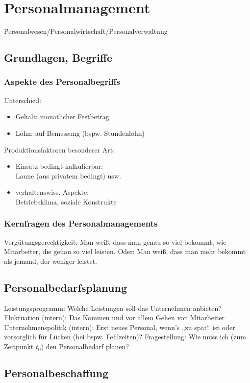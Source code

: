 \chapter{Personalmanagement}
Personalwesen/Personalwirtschaft/Personalverwaltung
\section{Grundlagen, Begriffe}
\subsection{Aspekte des Personalbegriffs}
Unterschied:
\begin{itemize}
\item Gehalt: monatlicher Festbetrag
\item Lohn: auf Bemessung (bspw. Stundenlohn)
\end{itemize}
Produktionsfaktoren besonderer Art:
\begin{itemize}
\item Einsatz bedingt kalkulierbar:\\
Laune (aus privatem bedingt) usw.
\item verhaltenswiss. Aspekte:\\
Betriebsklima, soziale Konstrukte
\end{itemize}
\subsection{Kernfragen des Personalmanagements}
Vergütungsgerechtigkeit: Man weiß, dass man genau so viel bekommt, wie Mitarbeiter, die genau so viel leisten. Oder: Man weiß, dass man mehr bekommt als jemand, der weniger leistet.

\section{Personalbedarfsplanung}
Leistungsprogramm: Welche Leistungen soll das Unternehmen anbieten?\\
Fluktuation (intern): Das Kommen und vor allem Gehen von Mitarbeiter\\
Unternehmenspolitik (intern): Erst neues Personal, wenn's „zu spät“ ist oder vorsorglich für Lücken (bei bspw. Fehlzeiten)?
Fragestellung: Wie muss ich (zum Zeitpunkt $t_0$) den Personalbedarf planen?

\section{Personalbeschaffung}
